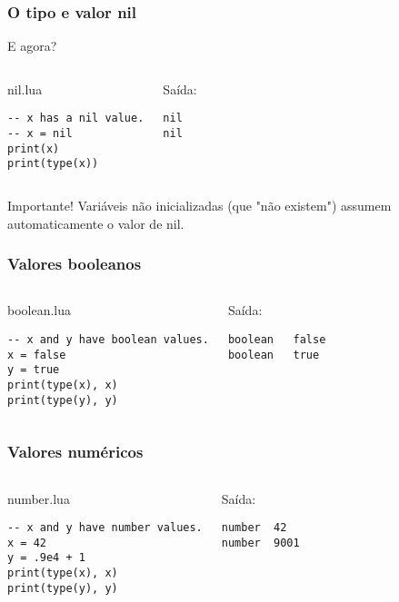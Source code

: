 \documentclass[brazil]{beamer}
\begin{document}
\begin{frame}[fragile]
  \frametitle{O tipo e valor nil}
  \begin{center}E agora?\end{center}
  \begin{columns}
      \begin{block}{nil.lua}
        \begin{lstlisting}
-- x has a nil value.
-- x = nil
print(x)
print(type(x))
        \end{lstlisting}
      \end{block}
    \pause
      \begin{block}{Saída:}
        \begin{verbatim}
nil
nil     \end{verbatim}
      \end{block}
  \end{columns}
  \pause
  \begin{center}
    Importante! Variáveis não inicializadas (que "não existem")
    assumem automaticamente o valor de nil.
  \end{center}
\end{frame}
\begin{frame}[fragile]
  \frametitle{Valores booleanos}
  \pause
  \begin{columns}
      \begin{block}{boolean.lua}
        \begin{lstlisting}
-- x and y have boolean values.
x = false
y = true
print(type(x), x)
print(type(y), y)
        \end{lstlisting}
      \end{block}
    \pause
      \begin{block}{Saída:}
        \begin{verbatim}
boolean   false
boolean   true  \end{verbatim}
      \end{block}
  \end{columns}
\end{frame}
\begin{frame}[fragile]
  \frametitle{Valores numéricos}
  \pause
  \begin{columns}
      \begin{block}{number.lua}
        \begin{lstlisting}
-- x and y have number values.
x = 42
y = .9e4 + 1
print(type(x), x)
print(type(y), y)
        \end{lstlisting}
      \end{block}
    \pause
      \begin{block}{Saída:}
        \begin{verbatim}
number  42
number  9001  \end{verbatim}
      \end{block}
  \end{columns}
\end{frame}
\end{document}
